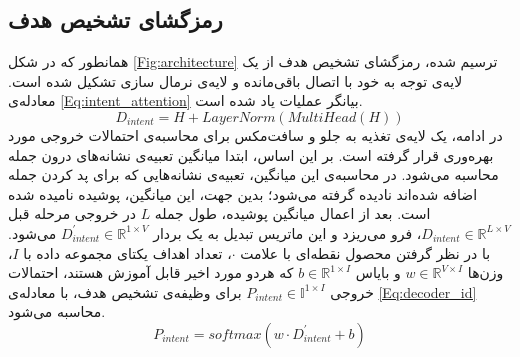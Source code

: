 \subsection{رمزگشای تشخیص هدف}
همانطور که در شکل \ref{Fig:architecture} ترسیم شده، رمزگشای تشخیص هدف از یک لایه‌ی توجه به خود با اتصال باقی‌مانده و لایه‌ی نرمال سازی تشکیل شده است. معادله‌ی \ref{Eq:intent_attention} بیانگر عملیات یاد شده است. 
\begin{equation}
	D_{intent} = H + LayerNorm(  MultiHead(H)  )
	\label{Eq:intent_attention}
\end{equation}
 در ادامه، یک لایه‌ی تغذیه به جلو و سافت‌مکس برای محاسبه‌ی احتمالات خروجی مورد بهره‌وری قرار گرفته است. بر این اساس، ابتدا میانگین تعبیه‌ی نشانه‌های درون جمله محاسبه می‌شود. در محاسبه‌ی این میانگین، تعبیه‌ی نشانه‌هایی که برای پد کردن جمله اضافه شده‌اند نادیده گرفته می‌شود؛ بدین جهت، این میانگین، پوشیده نامیده شده است. بعد از اعمال میانگین پوشیده، طول جمله $L$ در خروجی مرحله قبل $D_{intent}\in\mathbb{R}^{L\times V}$، فرو می‌ریزد و این ماتریس تبدیل به یک بردار $D_{intent}^{\prime}\in\mathbb{R}^{1\times V}$ می‌شود. با در نظر گرفتن محصول نقطه‌ای با علامت $\cdot$، تعداد اهداف یکتای مجموعه داده با $I$، وزن‌ها $w\in\mathbb{R}^{V\times I}$
و بایاس $b\in\mathbb{R}^{1\times I}$ که هردو مورد اخیر قابل آموزش هستند، احتمالات خروجی $P_{intent}\in\mathbb{I}^{1\times I}$ برای وظیفه‌ی تشخیص هدف، با معادله‌ی \ref{Eq:decoder_id} محاسبه می‌شود.
\begin{equation}
	P_{intent} = softmax( w\cdot D_{intent}^{\prime} + b )
	\label{Eq:decoder_id}
\end{equation}

